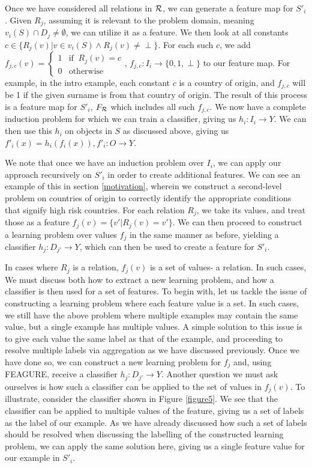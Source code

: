 \documentclass[twoside,11pt]{article}
\theoremstyle{definition}
\begin{document}
Once we have considered all relations in ${\cal R}$, we can generate a feature map for $S'_i$. Given $R_j$, assuming it is relevant to the problem domain, meaning $v_i(S)\cap D_j\neq\emptyset$, we can utilize it as a feature. We then look at all constants $c\in \{R_j(v)|v\in v_i(S)\land R_j(v)\neq \perp\}$. For each such $c$, we add  $f_{j,c}(v)=\begin{cases} 1 &\mbox{if } \ R_j(v)=c\\ 
0 & \mbox{otherwise } \end{cases}$, $f_{j,c}:I_i\rightarrow \{0,1,\perp\}$ to our feature map. 
For example, in the intro example, each constant $c$ is a country of origin, and $f_{j,c}$ will be 1 if the given surname is from that country of origin.
The result of this process is a feature map for $S'_i$, $F_{\cal R}$ which includes all such $f_{j,c}$. We now have a complete induction problem for which we can train a classifier, giving us $h_i:I_i\rightarrow Y$. We can then use this $h_i$ on objects in $S$ as discussed above, giving us $f'_{i}(x)=h_{i}(f_{i}(x)), f'_{i}:O\rightarrow Y$. 

We note that once we have an induction problem over $I_i$, we can apply our approach recursively on $S'_i$ in order to create additional features. We can see an example of this in section \ref{motivation}, wherein we construct a second-level problem on countries of origin to correctly identify the appropriate conditions that signify high risk countries.
 For each relation $R_j$, we take its values, and treat those as a feature $f_j(v)=\{v'|R_j(v)=v' \}$. We can then proceed to construct a learning problem over values $f_j$ in the same manner as before, yielding a classifier $h_j:D_{j'}\rightarrow Y$, which can then be used to create a feature for $S'_i$. 
 
 In cases where $R_j$ is a relation, $f_j(v)$ is a set of values- a relation. In such cases, We must discuss both how to extract a new learning problem, and how a classifier is then used for a set of features.
 To begin with, let us tackle the issue of constructing a learning problem where each feature value is a set. In such cases, we still have the above problem where multiple examples may contain the same value, but a single example has multiple values. A simple solution to this issue is to give each value the same label as that of the example, and proceeding to resolve multiple labels via aggregation as we have discussed previously. 
 Once we have done so, we can construct a new learning problem for $f_j$ and, using FEAGURE, receive a classifier $h_j:D_{j'}\rightarrow Y$.
 Another question we must ask ourselves is how such a classifier can be applied to the set of values in $f_j(v)$. To illustrate, consider the classifier shown in Figure \ref{figure5}. We see that the classifier can be applied to multiple values of the feature, giving us a set of labels as the label of our example. As we have already discussed how such a set of labels should be resolved when discussing the labelling of the constructed learning problem, we can apply the same solution here, giving us a single feature value for our example in $S'_i$.
\end{document}
